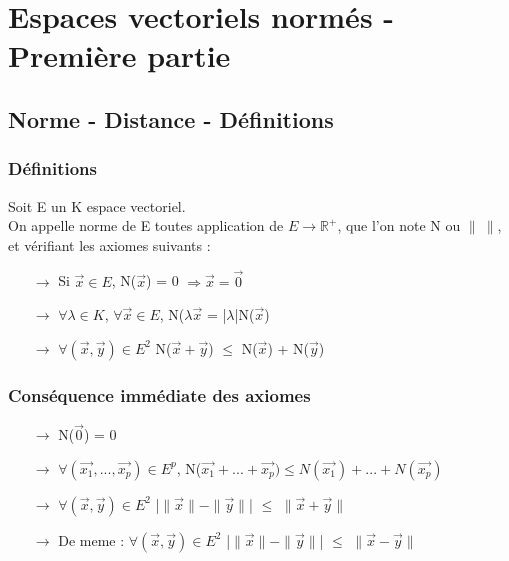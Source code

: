 \chapter{Espaces vectoriels normés - Première partie}
\section{Norme - Distance -  Définitions}
\subsection{Définitions}
\begin{de}
Soit E un K espace vectoriel.\\
On appelle norme de E toutes application de $E \rightarrow \mathbb{R}^+$, que l'on note N ou $\parallel~ \parallel$, et vérifiant les axiomes suivants : \\
\begin{itemize}
 \item[$\rightarrow$]Si $\overrightarrow{x} \in E$, N($\overrightarrow{x}$) = 0 $\Rightarrow \overrightarrow{x} = \overrightarrow{0}$\\
 \item[$\rightarrow$]$\forall \lambda \in K$, $\forall \overrightarrow{x} \in E$, N($\lambda\overrightarrow{x}$ = |$\lambda$|N($\overrightarrow{x}$)\\
 \item[$\rightarrow$]$\forall(\overrightarrow{x},\overrightarrow{y}) \in E^2$ N($\overrightarrow{x}+\overrightarrow{y}$) $\leq$ N($\overrightarrow{x}$) + N($\overrightarrow{y}$)\\
\end{itemize}
\end{de}
\subsection{Conséquence immédiate des axiomes}
\begin{itemize}
 \item[$\rightarrow$] N($\overrightarrow{0}$) = 0\\
 \item[$\rightarrow$] $\forall (\overrightarrow{x_1},...,\overrightarrow{x_p}) \in E^p$, N($\overrightarrow{x_1}+...+\overrightarrow{x_p}) \leq N(\overrightarrow{x_1}) + ... + N(\overrightarrow{x_p})$\\
 \item[$\rightarrow$] $\forall (\overrightarrow{x},\overrightarrow{y}) \in E^2$ |$\parallel\overrightarrow{x}\parallel - \parallel\overrightarrow{y}\parallel$| $\leq$ $\parallel\overrightarrow{x}+\overrightarrow{y}\parallel$\\
 \item[$\rightarrow$] De meme : $\forall (\overrightarrow{x},\overrightarrow{y}) \in E^2$ |$\parallel\overrightarrow{x}\parallel - \parallel\overrightarrow{y}\parallel$| $\leq$ $\parallel\overrightarrow{x}-\overrightarrow{y}\parallel$
\end{itemize}
